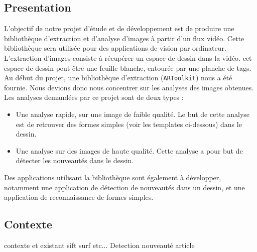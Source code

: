 \subsection{Presentation}

L'objectif de notre projet d'étude et de développement est de produire une bibliothèque d'extraction et d'analyse d'images à partir d'un flux vidéo. Cette bibliothèque sera utilisée pour des applications de vision par ordinateur.\\

L'extraction d'images consiste à récupérer un espace de dessin dans la vidéo. cet espace de dessin peut être une feuille blanche, entourée par une planche de tags. Au début du projet, une bibliothèque d'extraction (\texttt{ARToolkit}) nous a été fournie. Nous devions donc nous concentrer sur les analyses des images obtenues.\\

Les analyses demandées par ce projet sont de deux types : 
\begin{itemize}
\item Une analyse rapide, sur une image de faible qualité. Le but de cette analyse est de retrouver des formes simples (voir les templates ci-dessous) dans le dessin.
\item Une analyse sur des images de haute qualité. Cette analyse a pour but de détecter les nouveautés dans le dessin.\\
\end{itemize}
Des applications utilisant la bibliothèque sont également à développer, notamment une application de détection de nouveautés dans un dessin, et une application de reconnaissance de formes simples.


\subsection{Contexte}
contexte et existant sift surf etc...
Detection nouveauté article